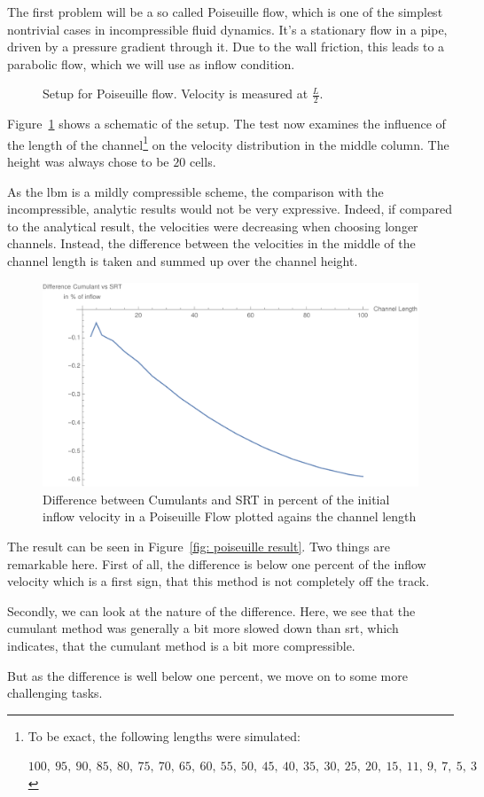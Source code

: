 The first problem will be a so called Poiseuille flow, which is one of the simplest nontrivial cases in incompressible fluid dynamics.
It's a stationary flow in a pipe, driven by a pressure gradient through it.
Due to the wall friction, this leads to a parabolic flow, which we will use as inflow condition.

\begin{figure}
  \centering
  
  \caption{Setup for Poiseuille flow. Velocity is measured at $\frac{L}{2}$.}
\label{fig: poiseuille}
\end{figure}

Figure~\ref{fig: poiseuille} shows a schematic of the setup.
The test now examines the influence of the length of the channel\footnote{To be exact, the following lengths were simulated:\par
 $100,\ 95,\ 90,\ 85,\ 80,\ 75,\ 70,\ 65,\ 60,\ 55,\ 50,\ 45,\ 40,\ 35,\ 30,\ 25,\ 20,\ 15,\ 11,\ 9,\ 7,\ 5,\ 3$
} on the velocity distribution in the middle column.
The height was always chose to be $20$ cells.

As the \gls{lbm} is a mildly compressible scheme, the comparison with the incompressible, analytic results would not be very expressive.
Indeed, if compared to the analytical result, the velocities were decreasing when choosing longer channels.
Instead, the difference between the velocities in the middle of the channel length is taken and summed up over the channel height.

\begin{figure}
  \centering
  \includegraphics[width=0.8\linewidth]{../figures/poiseuille.pdf} %
  \caption{Difference between Cumulants and SRT in percent of the initial inflow velocity in a Poiseuille Flow plotted agains the channel length}
\label{fig: poiseuille result}
\end{figure}

The result can be seen in Figure~\eqref{fig: poiseuille result}.
Two things are remarkable here.
First of all, the difference is below one percent of the inflow velocity which is a first sign, that this method is not completely off the track.

Secondly, we can look at the nature of the difference.
Here, we see that the cumulant method was generally a bit more slowed down than \gls{srt}, which indicates, that the cumulant method is a bit more compressible.

But as the difference is well below one percent, we move on to some more challenging tasks.
